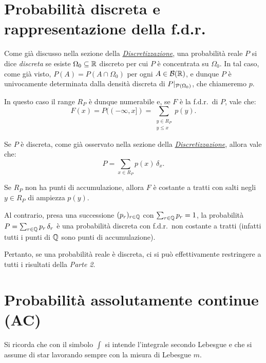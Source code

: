 \begin{multicols*}{2}
\section{Probabilità discreta e rappresentazione della f.d.r.}

Come già discusso nella sezione della \textit{\hyperref[sec:discretizzazione]{Discretizzazione}},
una probabilità reale $P$ si dice \textit{discreta} se esiste $\Omega_0 \subseteq \mathbb{R}$
discreto per cui $P$ è concentrata su $\Omega_0$. In tal caso, come già visto,
$P(A) = P(A \cap \Omega_0)$ per ogni $A \in \mathcal{B}(\mathbb{R})$, e dunque $P$ è univocamente determinata
dalla densità discreta di $P\arrowvert_{\mathcal{P}(\Omega_0)}$, che chiameremo $p$. \smallskip


In questo caso il range $R_P$ è dunque numerabile e, se $F$ è la f.d.r.~di $P$, vale che:
\[
    F(x) = P((-\infty, x]) = \sum_{\substack{y \in R_P \\ y \leq x}} p(y).
\]

\begin{remark}
    Se $P$ è discreta, come già osservato nella sezione della \textit{\hyperref[remark:identità_discreta_dirac]{Discretizzazione}},
    allora vale che:
    \[
        P = \sum_{x \in R_P} p(x) \, \delta_x.
    \]
\end{remark}

\begin{remark}
    Se $R_P$ non ha punti di accumulazione, allora $F$ è costante a tratti con salti
    negli $y \in R_P$ di ampiezza $p(y)$. \smallskip


    Al contrario, presa una successione $(p_r)_{r \in \mathbb{Q}}$ con $\sum_{r \in \mathbb{Q}} p_r = 1$,
    la probabilità $P = \sum_{r \in \mathbb{Q}} p_r \, \delta_r$ è una probabilità discreta con
    f.d.r.~non costante a tratti (infatti tutti i punti di $\mathbb{Q}$ sono punti di accumulazione). 
\end{remark}

Pertanto, se una probabilità reale è discreta, ci si può effettivamente restringere a tutti
i risultati della \textit{Parte 2}.

\section{Probabilità assolutamente continue (AC)}

\begin{warn}
    Si ricorda che con il simbolo $\int$ si intende l'integrale
    secondo Lebesgue e che si assume di star lavorando sempre con la
    misura di Lebesgue $m$.
\end{warn}


\end{multicols*}
